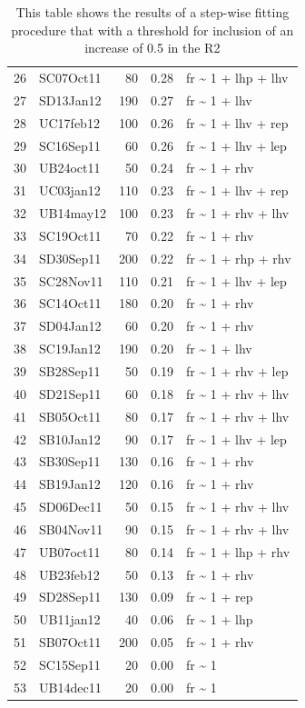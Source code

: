\documentclass[]{article}
\begin{document}
\begin{table}[ht]
\begin{tabular}{rlrrl}
  26 & SC07Oct11 &  80 & 0.28 & fr \~{} 1 + lhp + lhv \\ 
  27 & SD13Jan12 & 190 & 0.27 & fr \~{} 1 + lhv \\ 
  28 & UC17feb12 & 100 & 0.26 & fr \~{} 1 + lhv + rep \\ 
  29 & SC16Sep11 &  60 & 0.26 & fr \~{} 1 + lhv + lep \\ 
  30 & UB24oct11 &  50 & 0.24 & fr \~{} 1 + rhv \\ 
  31 & UC03jan12 & 110 & 0.23 & fr \~{} 1 + lhv + rep \\ 
  32 & UB14may12 & 100 & 0.23 & fr \~{} 1 + rhv + lhv \\ 
  33 & SC19Oct11 &  70 & 0.22 & fr \~{} 1 + rhv \\ 
  34 & SD30Sep11 & 200 & 0.22 & fr \~{} 1 + rhp + rhv \\ 
  35 & SC28Nov11 & 110 & 0.21 & fr \~{} 1 + lhv + lep \\ 
  36 & SC14Oct11 & 180 & 0.20 & fr \~{} 1 + rhv \\ 
  37 & SD04Jan12 &  60 & 0.20 & fr \~{} 1 + rhv \\ 
  38 & SC19Jan12 & 190 & 0.20 & fr \~{} 1 + lhv \\ 
  39 & SB28Sep11 &  50 & 0.19 & fr \~{} 1 + rhv + lep \\ 
  40 & SD21Sep11 &  60 & 0.18 & fr \~{} 1 + rhv + lhv \\ 
  41 & SB05Oct11 &  80 & 0.17 & fr \~{} 1 + rhv + lhv \\ 
  42 & SB10Jan12 &  90 & 0.17 & fr \~{} 1 + lhv + lep \\ 
  43 & SB30Sep11 & 130 & 0.16 & fr \~{} 1 + rhv \\ 
  44 & SB19Jan12 & 120 & 0.16 & fr \~{} 1 + rhv \\ 
  45 & SD06Dec11 &  50 & 0.15 & fr \~{} 1 + rhv + lhv \\ 
  46 & SB04Nov11 &  90 & 0.15 & fr \~{} 1 + rhv + lhv \\ 
  47 & UB07oct11 &  80 & 0.14 & fr \~{} 1 + lhp + rhv \\ 
  48 & UB23feb12 &  50 & 0.13 & fr \~{} 1 + rhv \\ 
  49 & SD28Sep11 & 130 & 0.09 & fr \~{} 1 + rep \\ 
  50 & UB11jan12 &  40 & 0.06 & fr \~{} 1 + lhp \\ 
  51 & SB07Oct11 & 200 & 0.05 & fr \~{} 1 + rhv \\ 
  52 & SC15Sep11 &  20 & 0.00 & fr \~{} 1 \\ 
  53 & UB14dec11 &  20 & 0.00 & fr \~{} 1 \\ 
   \hline
\end{tabular}
\caption{This table shows the results of a step-wise fitting procedure that with a threshold for inclusion of an increase of 0.5 in the R2} 
\end{table}
\end{document}
